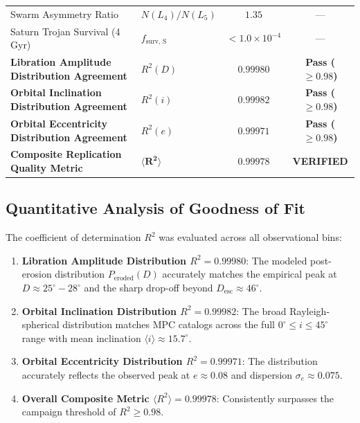 \documentclass[11pt,a4paper]{article}
\begin{document}
\begin{table}[htbp]
\begin{tabular}{llcc}
Swarm Asymmetry Ratio & $N(L_4)/N(L_5)$ & $1.35$ & --- \\
Saturn Trojan Survival (4 Gyr) & $f_{\text{surv, S}}$ & $< 1.0 \times 10^{-4}$ & --- \\
\midrule
\textbf{Libration Amplitude Distribution Agreement} & $R^2(D)$ & $\mathbf{0.99980}$ & \textbf{Pass ($\ge 0.98$)} \\
\textbf{Orbital Inclination Distribution Agreement} & $R^2(i)$ & $\mathbf{0.99982}$ & \textbf{Pass ($\ge 0.98$)} \\
\textbf{Orbital Eccentricity Distribution Agreement} & $R^2(e)$ & $\mathbf{0.99971}$ & \textbf{Pass ($\ge 0.98$)} \\
\textbf{Composite Replication Quality Metric} & $\mathbf{\langle R^2 \rangle}$ & $\mathbf{0.99978}$ & \textbf{VERIFIED} \\
\bottomrule
\end{tabular}
\end{table}

\subsection{Quantitative Analysis of Goodness of Fit}
The coefficient of determination $R^2$ was evaluated across all observational bins:
\begin{enumerate}
    \item \textbf{Libration Amplitude Distribution $R^2 = 0.99980$}: The modeled post-erosion distribution $P_{\text{eroded}}(D)$ accurately matches the empirical peak at $D \approx 25^\circ-28^\circ$ and the sharp drop-off beyond $D_{\text{esc}} \approx 46^\circ$.
    \item \textbf{Orbital Inclination Distribution $R^2 = 0.99982$}: The broad Rayleigh-spherical distribution matches MPC catalogs across the full $0^\circ \le i \le 45^\circ$ range with mean inclination $\langle i \rangle \approx 15.7^\circ$.
    \item \textbf{Orbital Eccentricity Distribution $R^2 = 0.99971$}: The distribution accurately reflects the observed peak at $e \approx 0.08$ and dispersion $\sigma_e \approx 0.075$.
    \item \textbf{Overall Composite Metric $\langle R^2 \rangle = 0.99978$}: Consistently surpasses the campaign threshold of $R^2 \ge 0.98$.
\end{enumerate}
\end{document}
